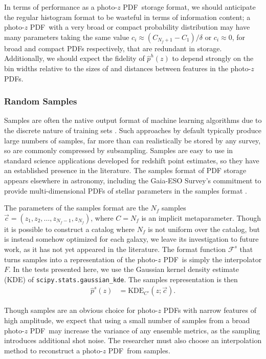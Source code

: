 \documentclass[\docopts]{\docclass}
\newcommand{\pz}{photo-$z$ PDF}
\begin{document}
In terms of performance as a \pz\ storage format, we should anticipate the 
regular histogram format to be wasteful in terms of information content; a \pz\ 
with a very broad or compact probability distribution may have many parameters 
taking the same value $c_{i} \approx (C_{N_{f}+1} - C_{1}) / \delta$ or $c_{i} 
\approx 0$, for broad and compact PDFs respectively, that are redundant in 
storage.
Additionally, we should expect the fidelity of $\hat{p}^{h}(z)$ to depend 
strongly on the bin widths relative to the sizes of and distances between 
features in the \pz s.

\subsubsection{Random Samples}
\label{sec:samples}

Samples are often the native output format of machine learning algorithms due 
to the discrete nature of training sets \citep{de_vicente_dnf_2016}.
Such approaches by default typically produce large numbers of samples, far more 
than can realistically be stored by any survey, so are commonly compressed by 
subsampling\citep{hoyle_dark_2017}.
Samples are easy to use in standard science applications developed for redshift 
point estimates, so they have an established presence in the 
literature\citep{bonnett_redshift_2016}.
The samples format of PDF storage appears elsewhere in astronomy, including the 
Gaia-ESO Survey's commitment to provide multi-dimensional PDFs of stellar 
parameters in the samples format \citep{bailer-jones_gaia_2013}.

The parameters of the samples format are the $N_{f}$ samples $\vec{c}=(z_{1}, 
z_{2}, \dots, z_{N_{f}-1}, z_{N_{f}})$, where $C=N_{f}$ is an implicit 
metaparameter.
Though it is possible to construct a catalog where $N_{f}$ is not uniform over 
the catalog, but is instead somehow optimized for each galaxy, we leave its 
investigation to future work, as it has not yet appeared in the literature.
The format function $\mathcal{F}^{s}$ that turns samples into a representation 
of the \pz\ is simply the interpolator $F$.
In the tests presented here, we use the Gaussian kernel density estimate (KDE) 
of \texttt{scipy.stats.gaussian\_kde}.
The samples representation is then
\begin{align}
  \label{eq:sampled}
  \hat{p}^{s}(z) &= \mathrm{KDE}_{C'}(z; \vec{c}).
\end{align}

Though samples are an obvious choice for \pz s with narrow features of high 
amplitude, we expect that using a small number of samples from a broad \pz\ may 
increase the variance of any ensemble metrics, as the sampling introduces 
additional shot noise.
The researcher must also choose an interpolation method to reconstruct a \pz\ 
from samples.
\end{document}
